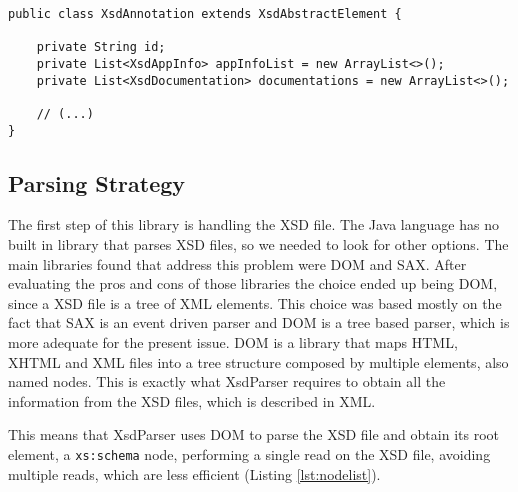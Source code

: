 \bigskip


\begin{minipage}{\linewidth}
\begin{lstlisting}[caption={Simplified Version of the Generated XsdAnnotation Class}, label={lst:xsdannotationexample}]
public class XsdAnnotation extends XsdAbstractElement {

    private String id;
    private List<XsdAppInfo> appInfoList = new ArrayList<>();
    private List<XsdDocumentation> documentations = new ArrayList<>();
    
    // (...)
}
\end{lstlisting}
\end{minipage}

\subsection{Parsing Strategy}
\label{sec:parsingstrategy}

The first step of this library is handling the \ac{XSD} file. The Java language has no built in library that parses \ac{XSD} files, so we needed to look for other options. The main libraries found that address this problem were \ac{DOM} and \ac{SAX}. After evaluating the pros and cons of those libraries the choice ended up being \ac{DOM}, since a \ac{XSD} file is a tree of \ac{XML} elements. This choice was based mostly on the fact that \ac{SAX} is an event driven parser and \ac{DOM} is a tree based parser, which is more adequate for the present issue. \ac{DOM} is a library that maps \ac{HTML}, \ac{XHTML} and \ac{XML} files into a tree structure composed by multiple elements, also named nodes. This is exactly what XsdParser requires to obtain all the information from the \ac{XSD} files, which is described in \ac{XML}. 

\noindent
This means that XsdParser uses \ac{DOM} to parse the \ac{XSD} file and obtain its root element, a \texttt{xs:schema} node, performing a single read on the \ac{XSD} file, avoiding multiple reads, which are less efficient (Listing \ref{lst:nodelist}). 

\bigskip


